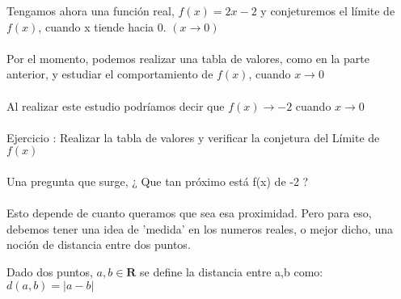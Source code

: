\documentclass[11pt, a4paper]{article}
\begin{document}
Tengamos ahora una funci\'on real,  $ f(x) = 2x - 2 $ y conjeturemos el l\'imite de $f(x)$, cuando x tiende hacia 0. $( x \to 0 )$ \\ \\
Por el momento, podemos realizar una tabla de valores, como en la parte anterior, y estudiar el comportamiento de $f(x)$, cuando $x \to 0$\\ \\
Al realizar este estudio podr\'iamos decir que {\color{blue} $f(x) \to -2$ {\color{black}cuando} $x \to 0 $}\\ \\
{\color{magenta} Ejercicio : Realizar la tabla de valores y verificar la conjetura del L\'imite de $f(x)$ }\\ \\ 
Una pregunta que surge, {\color{blue}¿ Que tan pr\'oximo est\'a f(x) de -2 ?} \\ \\
Esto depende de cuanto queramos que sea esa proximidad. Pero para eso, debemos tener una idea de 'medida' en los numeros reales, o mejor dicho, una noci\'on de distancia entre dos puntos. \\
\begin{center}
    Dado dos puntos, $a,b \in \mathbf{R}$ se define la distancia entre a,b como: $d(a,b) = | a - b |$
\end{center}
\end{document}
